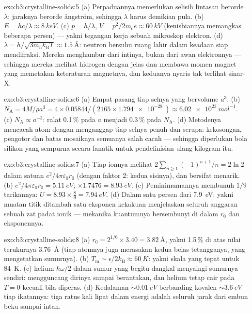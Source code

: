 \begin{solution}{exo:b3:crystalline-solids:5}
(a) Perpaduannya memerlukan selisih lintasan berorde $\lambda$;
jaraknya berorde ångström, sehingga $\lambda$ harus demikian pula. (b) $E =
hc/\lambda \approx \qty{8}{keV}$. (c) $p = h/\lambda$, $V =
p^2/2m_{\text{e}}e \approx \qty{60}{kV}$ (kenisbiannya memangkas beberapa
persen) --- yakni tegangan kerja sebuah mikroskop elektron. (d)
$\lambda = h/\sqrt{3m_{\text{n}}k_{\text{B}}T} \approx
\qty{1.5}{\angstrom}$: neutron bersuhu ruang lahir dalam keadaan siap
mendifraksi. Mereka menghambur dari intinya, bukan dari awan elektronnya
--- sehingga mereka melihat hidrogen dengan jelas dan membawa momen magnet
yang memetakan keteraturan magnetnya, dan keduanya nyaris tak terlihat sinar-X.
\end{solution}

\begin{solution}{exo:b3:crystalline-solids:6}
(a) Empat pasang tiap selnya yang bervolume $a^3$. (b) $N_{\text{A}} =
4M/\rho a^3 = 4\times0.05844/(2165\times\qty{1.794e-28}{})
\approx \qty{6.02e23}{mol^{-1}}$. (c) $N_{\text{A}} \propto
a^{-3}$: ralat 0.1\,\% pada $a$ menjadi 0.3\,\% pada $N_{\text{A}}$. (d)
Metodenya mencacah atom dengan menganggap tiap selnya penuh dan
serupa: kekosongan, pengotor dan batas mosaiknya semuanya
salah cacah --- sehingga diperlukan bola silikon yang sempurna secara
fanatik untuk pendefinisian ulang kilogram itu.
\end{solution}

\begin{solution}{exo:b3:crystalline-solids:7}
(a) Tiap ionnya melihat $2\sum_{n\ge1}(-1)^{n+1}/n = 2\ln2$ dalam satuan
$e^2/4\pi\varepsilon_0r_0$ (dengan faktor 2: kedua sisinya), dan bersifat menarik. (b)
$e^2/4\pi\varepsilon_0r_0 = \qty{5.11}{eV}$; $\times1.7476 =
\qty{8.93}{eV}$. (c) Peminimumannya membunuh $1/9$ tarikannya:
$U = 8.93\times\tfrac89 = \qty{7.94}{eV}$. (d) Dalam satu persen
dari \qty{7.9}{eV}: yakni  muatan titik ditambah satu eksponen
kekakuan menjelaskan seluruh anggaran sebuah zat padat ionik --- mekanika
kuantumnya bersembunyi di dalam $r_0$ dan eksponennya.
\end{solution}

\begin{solution}{exo:b3:crystalline-solids:8}
(a) $r_0 = 2^{1/6}\times3.40 = \qty{3.82}{\angstrom}$, yakni 1.5\,\%
di atas nilai terukurnya \qty{3.76}{\angstrom} (tiap atomnya juga merasakan
kedua belas tetangganya, yang mengetatkan sumurnya). (b)
$T_{\text{m}} \sim \epsilon/2k_{\text{B}} \approx \qty{60}{K}$:
yakni skala yang tepat untuk \qty{84}{K}. (c)  helium
$\hbar\omega/2$ dalam sumur yang begitu dangkal menyaingi sumurnya sendiri:
 mengguncang dirinya sampai berantakan, dan helium tetap cair pada $T = 0$
kecuali bila diperas. (d) Kedalaman $\sim\qty{0.01}{eV}$ berbanding kovalen
$\sim\qty{3.6}{eV}$ tiap ikatannya: tiga ratus kali lipat dalam energi adalah
seluruh jarak dari embun beku sampai intan.
\end{solution}

